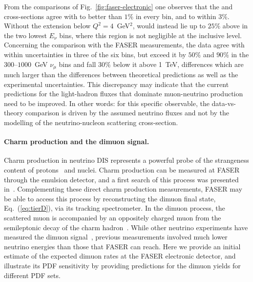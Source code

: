 From the comparisons of Fig.~\ref{fig:faser-electronic} one observes that the \sherpa and \herwig cross-sections agree with \powhegtwo to better than $1\%$ in every bin, and \genie to within $3\%$.
%
Without the extension below $Q^2=4$~GeV$^2$, \genie would instead lie up to $25\%$ above \powhegtwo in the two lowest $E_\nu$ bins, where this region is not negligible at the inclusive level. 
%
Concerning the comparison with the FASER measurements, the data agree with \powhegtwo within uncertainties in three of the six bins, but exceed it by $50\%$ and $90\%$ in the $300$--$1000$~GeV $\nu_\mu$ bins and fall $30\%$ below it above 1~TeV, differences which are much larger than the differences between theoretical predictions as well as the experimental uncertainties.
%
This discrepancy may indicate that the current predictions for the light-hadron fluxes that dominate muon-neutrino production need to be improved. 
%
In other words: for this specific observable, the data-vs-theory comparison is driven by the assumed neutrino fluxes and not by the modelling of the neutrino-nucleon scattering cross-section.

\paragraph{Charm production and the dimuon signal.}
\label{sec:faser-dimuon}

Charm production in neutrino DIS represents a powerful probe of the strangeness content of protons~\cite{Faura:2020oom,Gao:2017kkx} and nuclei.
%
Charm production can be measured at FASER through the emulsion detector, and a first search of this process was presented in~\cite{FASER:2026charm}.
%
Complementing these direct charm production measurements, FASER may be able to access this process by reconstructing the dimuon final state, Eq.~(\ref{eq:tierD}), via its tracking spectrometer.
%
In the dimuon process, the scattered muon is accompanied by an oppositely charged muon from the semileptonic decay of the charm hadron~\cite{Helenius:2024fow,Helenius:2025fpy,Helenius:2026uuz}.
%
While other neutrino experiments have measured the dimuon signal~\cite{NuTeV:2001dfo,NOMAD:2013hbk}, previous measurements involved much lower neutrino energies than those that FASER can reach.
%
Here we provide an initial estimate of the expected dimuon rates at the FASER electronic detector, and illustrate its PDF sensitivity by providing predictions for the dimuon yields for different PDF sets. 

